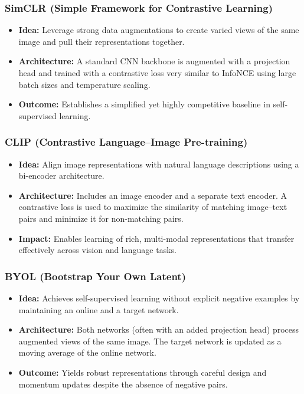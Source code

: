 \documentclass{article}
\begin{document}
\subsubsection{SimCLR (Simple Framework for Contrastive Learning)}
\begin{itemize}
    \item \textbf{Idea:} Leverage strong data augmentations to create varied views of the same image and pull their representations together.
    \item \textbf{Architecture:} A standard CNN backbone is augmented with a projection head and trained with a contrastive loss very similar to InfoNCE using large batch sizes and temperature scaling.
    \item \textbf{Outcome:} Establishes a simplified yet highly competitive baseline in self-supervised learning.
\end{itemize}

\subsubsection{CLIP (Contrastive Language–Image Pre-training)}
\begin{itemize}
    \item \textbf{Idea:} Align image representations with natural language descriptions using a bi-encoder architecture.
    \item \textbf{Architecture:} Includes an image encoder and a separate text encoder. A contrastive loss is used to maximize the similarity of matching image--text pairs and minimize it for non-matching pairs.
    \item \textbf{Impact:} Enables learning of rich, multi-modal representations that transfer effectively across vision and language tasks.
\end{itemize}

\subsubsection{BYOL (Bootstrap Your Own Latent)}
\begin{itemize}
    \item \textbf{Idea:} Achieves self-supervised learning without explicit negative examples by maintaining an online and a target network.
    \item \textbf{Architecture:} Both networks (often with an added projection head) process augmented views of the same image. The target network is updated as a moving average of the online network.
    \item \textbf{Outcome:} Yields robust representations through careful design and momentum updates despite the absence of negative pairs.
\end{itemize}
\end{document}
